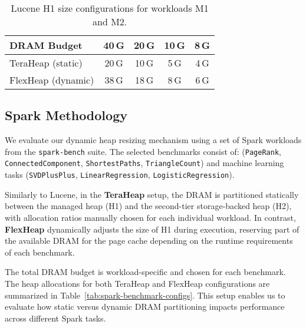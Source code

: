\begin{table}[H]
\centering
\renewcommand{\arraystretch}{1.1}
\caption{Lucene H1 size configurations for workloads M1 and M2.}
\label{tab:lucene-configs}
\begin{tabular}{|l|c|c|c|c|}

\hline
  \textbf{DRAM Budget} & 40\,G & 20\,G & 10\,G & 8\,G \\
\hline
  TeraHeap (static)& 20\,G & 10\,G & 5\,G & 4\,G \\
\hline
  FlexHeap (dynamic)& 38\,G & 18\,G  & 8\,G & 6\,G \\
\hline
 
\end{tabular}
\end{table}

\subsection{Spark Methodology}
\label{sec:spark-methodology}

We evaluate our dynamic heap resizing mechanism using a set of Spark workloads 
from the \texttt{spark-bench} suite. The selected benchmarks consist of:
(\texttt{PageRank}, \texttt{ConnectedComponent}, \texttt{ShortestPaths}, \texttt{TriangleCount}) 
and machine learning tasks (\texttt{SVDPlusPlus}, \texttt{LinearRegression}, \texttt{LogisticRegression}).

Similarly to Lucene, in the \textbf{TeraHeap} setup, the DRAM is partitioned statically between the managed heap (H1) and the second-tier 
storage-backed heap (H2), with allocation ratios manually chosen for each individual workload. In contrast, \textbf{FlexHeap} 
dynamically adjusts the size of H1 during execution, reserving part of the available DRAM for the page cache depending on
the runtime requirements of each benchmark. 

The total DRAM budget is workload-specific and chosen for each benchmark.
The heap allocations for both TeraHeap and FlexHeap configurations are summarized in Table~\ref{tab:spark-benchmark-configs}.
This setup enables us to evaluate how static versus dynamic DRAM partitioning impacts performance across different Spark tasks.


